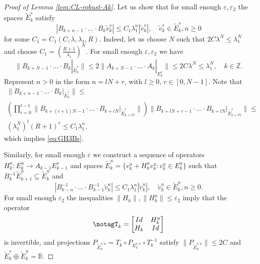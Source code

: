 \documentclass[12pt]{article}
\newcommand{\Bb}{\mathbb{B}}
\newcommand{\Zz}{\mathbb{Z}}
\theoremstyle{definition}
\begin{document}
\begin{proof}[Proof of Lemma \ref{lem:CL-robust-Ak}]
Let us show that for small enough $\varepsilon, \varepsilon_2$ the spaces $\tilde{E}_k^s$ satisfy 
\begin{equation}\label{eq:GH3Bs}
    |B_{k+n-1} \cdot \ldots \cdot B_k\tilde{v}^s_k| \leq C_1 \lambda_1^n |\tilde{v}^s_k|, \quad \tilde{v}^s_k \in \tilde{E}^s_k, n  \geq 0    
\end{equation}
for some $C_1 = C_1(C, \lambda, \lambda_1, R)$. Indeed, let us choose $N$ such that $2C\lambda^N \leq \lambda_1^N$ and choose $C_1 = \left(\frac{R+1}{\lambda_1}\right)^N$. For small enough $\varepsilon, \varepsilon_2$ we have
$$
\|B_{k+N-1} \cdot \ldots \cdot B_k|_{\tilde{E}_k^s}\| \leq 2 \|A_{k+N-1} \cdot \ldots \cdot A_k|_{{E}_k^s}\| \leq 2C\lambda^N \leq \lambda_1^N, \quad k \in \Zz.
$$
Represent $n > 0$ in the form $n = lN + r$, with $l \geq 0$, $r \in [0, N-1]$.
Note that
\begin{multline}
\|B_{k+n-1} \cdot \ldots \cdot B_k|_{\tilde{E}_k^s}\| \leq \\
\left(\prod_{i = 0}^{l-1}\|B_{k+(i+1)N-1} \cdot \ldots \cdot B_{k+iN}|_{\tilde{E}_{k+iN}^s}\|\right)\|B_{k+lN+r-1} \cdot \ldots \cdot B_{k+lN}|_{\tilde{E}_{k+lN}^s}\| \leq \\ (\lambda_1^N)^l(R+1)^r\leq C_1\lambda_1^n, \label{eq:B-proof}
\end{multline}
which implies \eqref{eq:GH3Bs}.

Similarly, for small enough $\varepsilon$ we construct a sequence of operators $H_k^u:E_k^u \to A_{k-1}E_{k-1}^s$ and spaces $\tilde{E}_k^u = \{ v_k^u + H_k^uv_k^u : v_k^u \in E_k^u\}$ such that 
$
B_k^{-1} \tilde{E}_{k+1}^u \subseteq \tilde{E}_{k}^u
$
and
\begin{equation}\label{eq:GH3Bs-inv}
    |B_{k-n}^{-1} \cdot \ldots \cdot B_{k-1}^{-1}\tilde{v}^u_k| \leq C_1 \lambda_1^n |\tilde{v}^u_k|, \quad \tilde{v}^u_k \in \tilde{E}^u_k, n  \geq 0.
\end{equation}
For small enough $\varepsilon_2$ the inequalities $\|H_k\|, \|H_k^u\| \leq \varepsilon_2$ imply that the operator
\begin{equation}\notag%
T_k = 
\begin{bmatrix}
Id & H_k^u \\
H_k & Id 
\end{bmatrix}   
\end{equation}
is invertible, and projections
$
P_{\tilde{E}_{k}^{s, u}} = T_k\circ P_{{E}_k^{s, u}} \circ T^{-1}_{k} 
$
satisfy
$\|P_{\tilde{E}_{k}^{s, u}}\| \leq 2C$ and $\tilde{E}_k^s \oplus \tilde{E}_k^u = \Bb$.


\end{proof}
\end{document}
